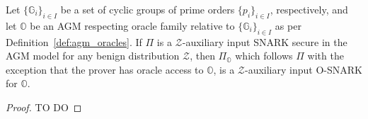 \begin{comment}
\begin{theorem}[O-SNARKS for AGM Respecting Oracles]
\label{the:when_osnarks} 
Let $\mathbb{G}$ be a cyclic group of prime order $p$ and let $\mathbb{O}$ be an AGM respecting oracle 
relative to $\mathbb{G}$ as per Definition~\ref{def:agm_oracles}. We denote by $\mathcal{Z}_{\mathbb{O}}$ the 
probability distribution of all the public parameters that define a member of $\mathbb{O}$ together with some 
polynomial number $Q$ of queries and answers to $\mathbb{O}$. More formally: 
$\mathcal{Z}_{\mathbb{O}} = (\mathit{pp}, \{\mathcal{O}(q_i), q_i\}_{i=1}^Q)$, 
$Q = \mathsf{poly}(\lambda)$, $(\mathit{pp}, \mathcal{O}) \leftarrow \mathbb{O}$. Then every $\mathcal{Z}_{\mathbb{O}}$-auxiliary 
input SNARK $\Pi$ secure in the AGM model with respect to $\mathbb{G}$ is an O-SNARK for $\mathbb{O}$.
\end{theorem}
\end{comment}

\begin{theorem}
\label{the:when_osnarks} 
Let $\{\mathbb{G}_{i}\}_{i  \in I}$ be a set of cyclic groups of prime orders $\{p_i\}_{i \in I}$, respectively, and let $\mathbb{O}$ be an AGM 
respecting oracle family relative to $\{\mathbb{G}_{i}\}_{i  \in I}$ as per Definition~\ref{def:agm_oracles}.
 If $\Pi$ is a $\mathcal{Z}$-auxiliary input SNARK secure in the AGM model for any benign 
distribution $\mathcal{Z}$, then $\Pi_{\mathbb{O}}$ which follows $\Pi$ with the exception that the prover has oracle access to $\mathbb{O}$, 
is a $\mathcal{Z}$-auxiliary input O-SNARK for $\mathbb{O}$.
\end{theorem}

\begin{proof}{\color{red}TO DO}
\begin{comment} Write a proof inspired by We denote by $\mathcal{Z}_{\mathbb{O}}$ the 
probability distribution of all the public parameters that define a member of $\mathbb{O}$ together with some 
polynomial number $Q$ of queries and answers to $\mathbb{O}$. More formally: 
$\mathcal{Z}_{\mathbb{O}} = (\mathit{pp}, \{\mathcal{O}(q_i), q_i\}_{i=1}^Q)$, 
$Q = \mathsf{poly}(\lambda)$, $(\mathit{pp}, \mathcal{O}) \leftarrow \mathbb{O}$. Then every $\mathcal{Z}_{\mathbb{O}}$-auxiliary 
input SNARK $\Pi$ secure in the AGM model with respect to $\mathbb{G}$ is an O-SNARK for $\mathbb{O}$.
\end{comment}
\end{proof}

